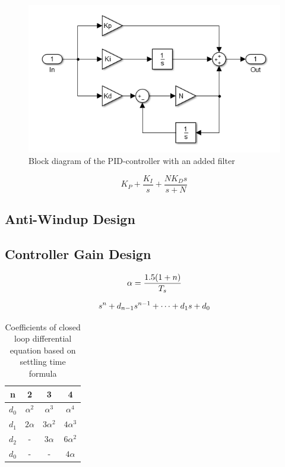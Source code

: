 \begin{figure}[!h]
	\centering
	\includegraphics[width=.7\linewidth]{graphics/pidwfilter}
	\caption{Block diagram of the PID-controller with an added filter}
	\label{fig:pidfilter}
\end{figure}

\begin{equation}
\label{eq:pidfilter}
K_P + \dfrac{K_I}{s} + \dfrac{N K_D s}{s + N}
\end{equation}

\subsection{Anti-Windup Design}

\subsection{Controller Gain Design}

\begin{equation}
\centering
\label{eq:settling}
\alpha = \dfrac{1.5(1 + n)}{T_s}
\end{equation}

\begin{equation}
\centering
\label{eq:standard}
s^n + d_{n-1}s^{n-1} + \cdots + d_1 s + d_0 
\end{equation}


\begin{table}[!h]
	\caption{ Coefficients of
		closed loop differential
		equation based on settling
		time formula\cite{feedback}}
	\centering
	\begin{tabular}{|c|c|c|c|}
		\hline
		n & 2 & 3 & 4\\
		\hline
		$d_0$ & $\alpha^2$ & $\alpha^3$ & $\alpha^4$\\ 
		$d_1$ & $2\alpha$ & $3\alpha^2$ & $4\alpha^3$\\
		$d_2$ & - & $3\alpha$ & $6\alpha^2$\\
		$d_0$ & - & - & $4\alpha$\\
		\hline
		

	\end{tabular}
\end{table}
